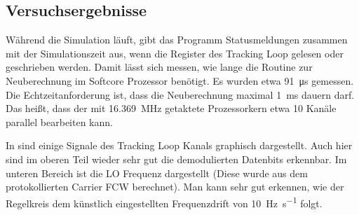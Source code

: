 \subsection{Versuchsergebnisse}
Während die Simulation läuft, gibt das Programm Statusmeldungen zusammen mit der Simulationszeit aus, wenn die Register des Tracking Loop gelesen oder geschrieben werden. Damit lässt sich messen, wie lange die Routine zur Neuberechnung im Softcore Prozessor benötigt. Es wurden etwa \SI{91}{\micro\second} gemessen. Die Echtzeitanforderung ist, dass die Neuberechnung maximal \SI{1}{\milli\second} dauern darf. Das heißt, dass der mit \SI{16.369}{\mega\hertz} getaktete Prozessorkern etwa 10 Kanäle parallel bearbeiten kann.

In  sind einige Signale des Tracking Loop Kanals graphisch dargestellt. Auch hier sind im oberen Teil wieder sehr gut die demodulierten Datenbits erkennbar. Im unteren Bereich ist die LO Frequenz dargestellt (Diese wurde aus dem protokollierten Carrier FCW berechnet). Man kann sehr gut erkennen, wie der Regelkreis dem künstlich eingestellten Frequenzdrift von \SI{10}{\hertz\per\second} folgt.


